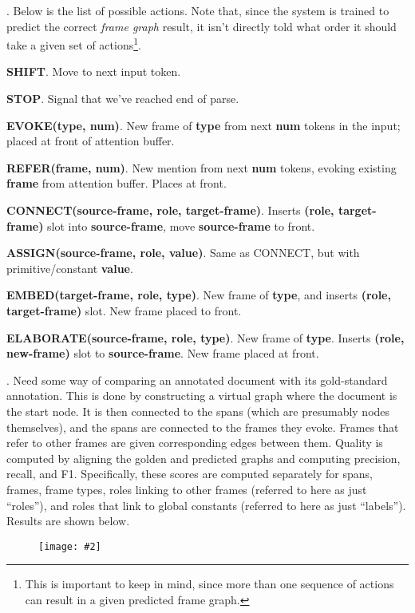 \documentclass[11pt]{article}
\newcommand\myfig[2][0.3\textwidth]{\begin{figure}[h!]\centering\texttt{[image: \#2]}\end{figure}}
\newcommand\myspace[1][]{\vspace{#1\bigskipamount}}
\newcommand\p{\Needspace{10\baselineskip} \noindent}
\begin{document}
\myspace
\p {}. Below is the list of possible actions. Note that, since the system is trained to predict the correct \textit{frame graph} result, it isn't directly told what order it should take a given set of actions\footnote{This is important to keep in mind, since more than one sequence of actions can result in a given predicted frame graph.}.
\begin{compactitem}
	\item \textbf{SHIFT}. Move to next input token.
	\item \textbf{STOP}. Signal that we've reached end of parse.
	\item \textbf{EVOKE(type, num)}. New frame of \textbf{type} from next \textbf{num} tokens in the input; placed at front of attention buffer.
	\item \textbf{REFER(frame, num)}. New mention from next \textbf{num} tokens, evoking existing \textbf{frame} from attention buffer. Places at front.
	\item \textbf{CONNECT(source-frame, role, target-frame)}. Inserts \textbf{(role, target-frame)} slot into \textbf{source-frame}, move \textbf{source-frame} to front.
	\item \textbf{ASSIGN(source-frame, role, value)}. Same as CONNECT, but with primitive/constant \textbf{value}.
	\item \textbf{EMBED(target-frame, role, type)}. New frame of \textbf{type}, and inserts \textbf{(role, target-frame)} slot. New frame placed to front.
	\item \textbf{ELABORATE(source-frame, role, type)}. New frame of \textbf{type}. Inserts \textbf{(role, new-frame)} slot to \textbf{source-frame}. New frame placed at front.
\end{compactitem}

\myspace
\p {}. Need some way of comparing an annotated document with its gold-standard annotation. This is done by constructing a virtual graph where the document is the start node. It is then connected to the spans (which are presumably nodes themselves), and the spans are connected to the frames they evoke. Frames that refer to other frames are given corresponding edges between them. Quality is computed by aligning the golden and predicted graphs and computing precision, recall, and F1. Specifically, these scores are computed separately for spans, frames, frame types, roles linking to other frames (referred to here as just ``roles''), and roles that link to global constants (referred to here as just ``labels''). Results are shown below.
\myfig[0.6\textwidth]{sling_eval.png}
\end{document}
